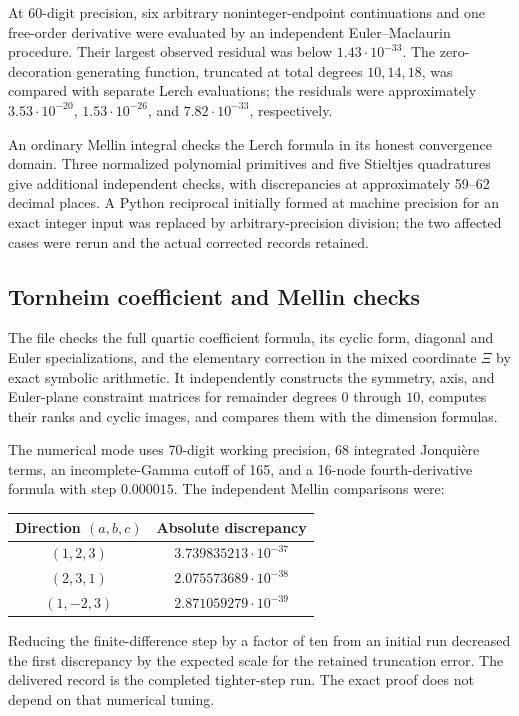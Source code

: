 At 60-digit precision, six arbitrary noninteger-endpoint
continuations and one free-order derivative were evaluated by
an independent Euler--Maclaurin procedure. Their largest
observed residual was below $1.43\cdot10^{-33}$.
The zero-decoration generating function, truncated at total
degrees $10,14,18$, was compared with separate Lerch evaluations;
the residuals were approximately
$3.53\cdot10^{-20}$, $1.53\cdot10^{-26}$, and
$7.82\cdot10^{-33}$, respectively.

An ordinary Mellin integral checks the Lerch formula in its
honest convergence domain. Three normalized polynomial
primitives and five Stieltjes quadratures give additional
independent checks, with discrepancies at approximately
59--62 decimal places. A Python reciprocal initially formed
at machine precision for an exact integer input was replaced
by arbitrary-precision division; the two affected cases were
rerun and the actual corrected records retained.

\subsection{Tornheim coefficient and Mellin checks}

The file  checks the full
quartic coefficient formula, its cyclic form, diagonal and
Euler specializations, and the elementary correction in
the mixed coordinate $\Xi$ by exact symbolic arithmetic.
It independently constructs the symmetry, axis, and
Euler-plane constraint matrices for remainder degrees
$0$ through $10$, computes their ranks and cyclic images,
and compares them with the dimension formulas.

The numerical mode uses 70-digit working precision, 68
integrated Jonqui\`ere terms, an incomplete-Gamma cutoff
of 165, and a 16-node fourth-derivative formula with step
$0.000015$. The independent Mellin comparisons were:
\begin{center}
\begin{tabular}{@{}cc@{}}
\toprule
Direction $(a,b,c)$ & Absolute discrepancy\\
\midrule
$(1,2,3)$  & $3.739835213\cdot10^{-37}$\\
$(2,3,1)$  & $2.075573689\cdot10^{-38}$\\
$(1,-2,3)$ & $2.871059279\cdot10^{-39}$\\
\bottomrule
\end{tabular}
\end{center}
Reducing the finite-difference step by a factor of ten
from an initial run decreased the first discrepancy by
the expected scale for the retained truncation error.
The delivered record is the completed tighter-step run.
The exact proof does not depend on that numerical tuning.

